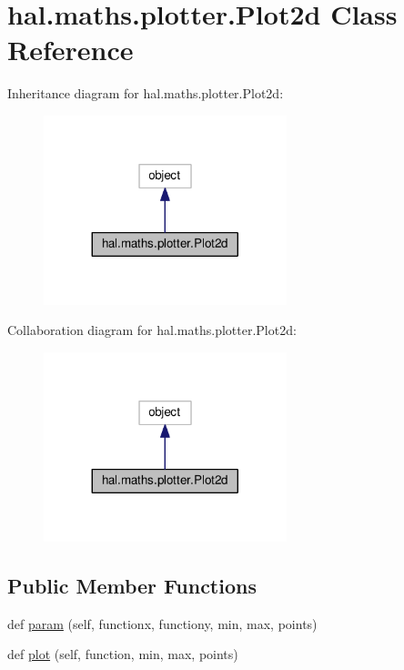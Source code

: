 \hypertarget{classhal_1_1maths_1_1plotter_1_1_plot2d}{}\section{hal.\+maths.\+plotter.\+Plot2d Class Reference}
\label{classhal_1_1maths_1_1plotter_1_1_plot2d}


Inheritance diagram for hal.\+maths.\+plotter.\+Plot2d\+:\nopagebreak
\begin{figure}[H]
\begin{center}
\leavevmode
\includegraphics[width=200pt]{classhal_1_1maths_1_1plotter_1_1_plot2d__inherit__graph}
\end{center}
\end{figure}


Collaboration diagram for hal.\+maths.\+plotter.\+Plot2d\+:\nopagebreak
\begin{figure}[H]
\begin{center}
\leavevmode
\includegraphics[width=200pt]{classhal_1_1maths_1_1plotter_1_1_plot2d__coll__graph}
\end{center}
\end{figure}
\subsection*{Public Member Functions}
\begin{DoxyCompactItemize}
\item 
def \hyperlink{classhal_1_1maths_1_1plotter_1_1_plot2d_a60f7295d6cad1639e30c6b0407a2b983}{param} (self, functionx, functiony, min, max, points)
\item 
def \hyperlink{classhal_1_1maths_1_1plotter_1_1_plot2d_aa340a489f84fc82aa7c69a868ebd11c3}{plot} (self, function, min, max, points)
\end{DoxyCompactItemize}
